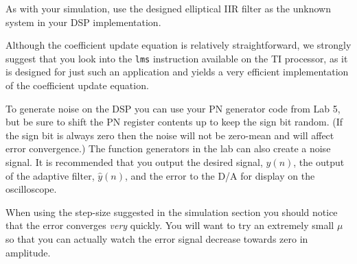 
%
%
%
%
%

As with your \matlab simulation, use the designed
elliptical IIR filter as the unknown system in your
DSP implementation.

Although the coefficient update equation is relatively
straightforward, we strongly suggest that you look into
the \verb+lms+ instruction available on the TI processor,
as it is designed for just such an application and yields
a very efficient implementation of the coefficient update
equation.

To generate noise on the DSP you can use your PN generator
code from Lab 5, but be sure to shift the PN register contents
up to keep the sign bit random.  (If the sign bit is always zero
then the noise will not be zero-mean and will affect error
convergence.)  The function generators in the lab can also 
create a noise signal.  It is recommended that you output the desired
signal, $y(n)$, the output of the adaptive filter, $\hat{y}(n)$,
and the error to the D/A for display on the oscilloscope.

When using the step-size suggested in the \matlab simulation
section you should notice that the error converges {\em very} quickly.
You will want to try an extremely small $\mu$ so that you can
actually watch the error signal decrease towards zero in amplitude.

